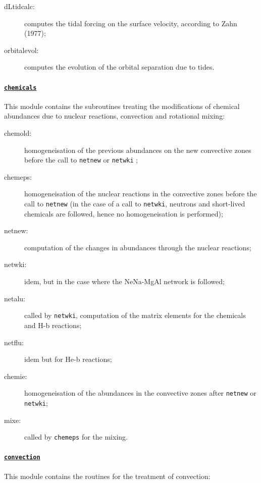 \documentclass[11pt]{article}
\begin{document}
 \begin{description}
   \item[dLtidcalc:] computes the tidal forcing on the surface velocity, according to Zahn (1977);
   \item[orbitalevol:] computes the evolution of the orbital separation due to tides.
 \end{description}

\paragraph{\underline{\texttt{chemicals}}}
This module contains the subroutines treating the modifications of chemical abundances due to nuclear reactions, convection and rotational mixing:

\begin{description}
 \item[chemold:] homogeneisation of the previous abundances on the new convective zones before the call to \texttt{netnew} or \texttt{netwki} ;
 \item[chemeps:] homogeneisation of the nuclear reactions in the convective zones before the call to \texttt{netnew} (in the case of a call to \texttt{netwki}, neutrons and short-lived chemicals are followed, hence no homogeneisation is performed);
 \item[netnew:] computation of the changes in abundances through the nuclear reactions;
 \item[netwki:] idem, but in the case where the NeNa-MgAl network is followed;
 \item[netalu:] called by \texttt{netwki}, computation of the matrix elements for the chemicals and H-b reactions;
 \item[netflu:] idem but for He-b reactions;
 \item[chemie:] homogeneisation of the abundances in the convective zones after \texttt{netnew} or \texttt{netwki};
 \item[mixe:] called by \texttt{chemeps} for the mixing.
 \end{description}

\paragraph{\underline{\texttt{convection}}}
This module contains the routines for the treatment of convection:
\end{document}
